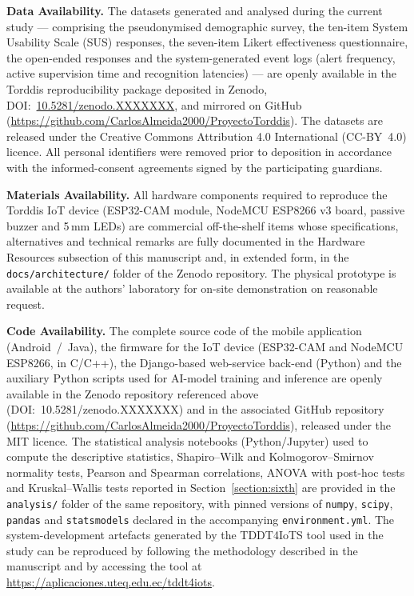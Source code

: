 \documentclass[pdflatex,sn-apa]{sn-jnl}
\begin{document}
    \textbf{Data Availability.}
        The datasets generated and analysed during the current study --- comprising the pseudonymised demographic survey, the ten-item System Usability Scale (SUS) responses, the seven-item Likert effectiveness questionnaire, the open-ended responses and the system-generated event logs (alert frequency, active supervision time and recognition latencies) --- are openly available in the Torddis reproducibility package deposited in Zenodo, DOI:~\href{https://doi.org/10.5281/zenodo.XXXXXXX}{10.5281/zenodo.XXXXXXX}, and mirrored on GitHub (\url{https://github.com/CarlosAlmeida2000/ProyectoTorddis}). The datasets are released under the Creative Commons Attribution 4.0 International (CC-BY~4.0) licence. All personal identifiers were removed prior to deposition in accordance with the informed-consent agreements signed by the participating guardians.

    \textbf{Materials Availability.}
        All hardware components required to reproduce the Torddis IoT device (ESP32-CAM module, NodeMCU ESP8266 v3 board, passive buzzer and 5\,mm LEDs) are commercial off-the-shelf items whose specifications, alternatives and technical remarks are fully documented in the Hardware Resources subsection of this manuscript and, in extended form, in the \texttt{docs/architecture/} folder of the Zenodo repository. The physical prototype is available at the authors' laboratory for on-site demonstration on reasonable request.

    \textbf{Code Availability.}
        The complete source code of the mobile application (Android~/~Java), the firmware for the IoT device (ESP32-CAM and NodeMCU ESP8266, in C/C++), the Django-based web-service back-end (Python) and the auxiliary Python scripts used for AI-model training and inference are openly available in the Zenodo repository referenced above (DOI:~10.5281/zenodo.XXXXXXX) and in the associated GitHub repository (\url{https://github.com/CarlosAlmeida2000/ProyectoTorddis}), released under the MIT licence. The statistical analysis notebooks (Python/Jupyter) used to compute the descriptive statistics, Shapiro--Wilk and Kolmogorov--Smirnov normality tests, Pearson and Spearman correlations, ANOVA with post-hoc tests and Kruskal--Wallis tests reported in Section~\ref{section:sixth} are provided in the \texttt{analysis/} folder of the same repository, with pinned versions of \texttt{numpy}, \texttt{scipy}, \texttt{pandas} and \texttt{statsmodels} declared in the accompanying \texttt{environment.yml}. The system-development artefacts generated by the TDDT4IoTS tool used in the study can be reproduced by following the methodology described in the manuscript and by accessing the tool at \url{https://aplicaciones.uteq.edu.ec/tddt4iots}.
\end{document}
